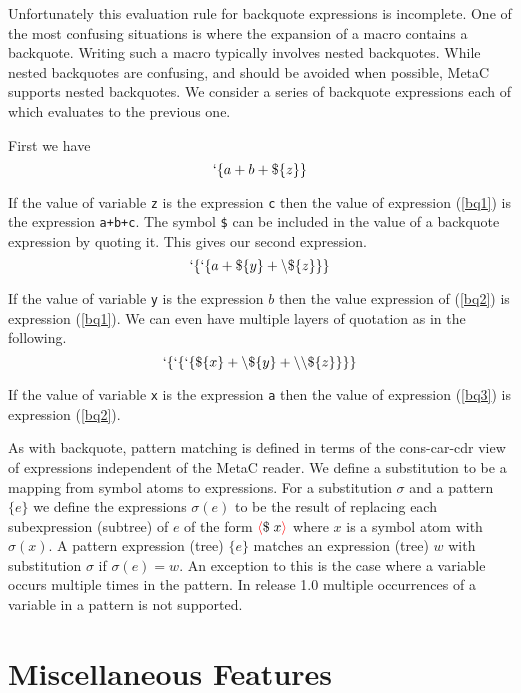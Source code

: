 \documentclass{article}
\newcommand{\fopen}{{\color{red} \langle}}
\newcommand{\fclose}{{\color{red} \rangle}}
\begin{document}
Unfortunately this evaluation rule for backquote expressions is incomplete.  One of the most
confusing situations is where the expansion of a macro contains a backquote.  Writing such a macro typically involves nested backquotes.  While nested backquotes
are confusing, and should be avoided when possible, MetaC supports nested backquotes.  We consider a series of backquote expressions each of which evaluates to the previous one.

First we have
\begin{equation}
\label{bq1}
`\{a+b+\$\{z\}\}
\end{equation}

If the value of variable {\tt z} is the expression {\tt c} then the value of expression (\ref{bq1}) is the expression {\tt a+b+c}.
The symbol {\tt \$} can be included in the value of a backquote expression by quoting it.  This gives our second expression.
\begin{equation}
\label{bq2}
`\{`\{a + \$\{y\} + \backslash\$\{z\}\}\}
\end{equation}

If the value of variable {\tt y} is the expression $b$ then the value expression of (\ref{bq2}) is expression (\ref{bq1}).
We can even have multiple layers of quotation as in the following.
\begin{equation}
\label{bq3}
`\{`\{`\{\$\{x\} + \backslash\$\{y\} + \backslash\backslash\$\{z\}\}\}\}
\end{equation}

If the value of variable {\tt x} is the expression {\tt a} then the value of expression (\ref{bq3}) is expression (\ref{bq2}).

As with backquote, pattern matching is defined in terms of the cons-car-cdr view of expressions independent of the MetaC reader.  We define a substitution to be a mapping from
symbol atoms to expressions. For a substitution $\sigma$ and a pattern $\{e\}$ we define the expressions $\sigma(e)$
to be the result of replacing each subexpression (subtree) of $e$ of the form $\fopen \$\;x \fclose$ where $x$ is a symbol atom with $\sigma(x)$.  A pattern expression (tree) $\{e\}$ matches an expression (tree) $w$ with substitution $\sigma$
if $\sigma(e) = w$. An exception to this is the case where a variable occurs multiple times in the pattern.  In release 1.0 multiple occurrences of a variable in a pattern is not supported.

\section{Miscellaneous Features}
\end{document}
